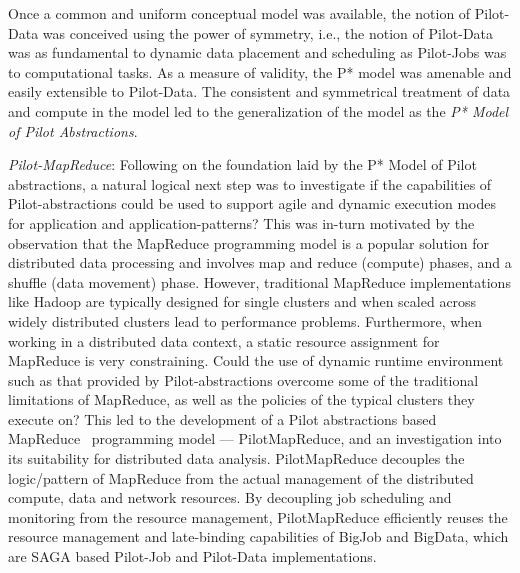 \documentclass[times]{cpeauth}
\newcommand{\pilot}{Pilot\xspace}
\newcommand{\pilotjobs}{Pilot-Jobs\xspace}
\newcommand{\pilotdata}{Pilot-Data\xspace}
\newcommand{\pilotmapreduce}{PilotMapReduce\xspace}
\newcommand{\pstar}{P*\xspace}
\begin{document}
Once a common and uniform conceptual model was available, the notion
of \pilotdata was conceived using the power of symmetry, i.e., the
notion of \pilotdata was as fundamental to dynamic data placement and
scheduling as \pilotjobs was to computational tasks. As a measure of
validity, the \pstar model was amenable and easily extensible to
\pilotdata.  The consistent and symmetrical treatment of data and
compute in the model led to the generalization of the model as the
{\it P* Model of Pilot Abstractions}.


{\it Pilot-MapReduce}: Following on the foundation laid by the P*
Model of Pilot abstractions, a natural logical next step was to
investigate if the capabilities of \pilot-abstractions could be used
to support agile and dynamic execution modes for application and
application-patterns?  This was in-turn motivated by the observation
that the MapReduce programming model is a popular solution for
distributed data processing and involves map and reduce (compute)
phases, and a shuffle (data movement) phase. However, traditional
MapReduce implementations like Hadoop are typically designed for
single clusters and when scaled across widely distributed clusters
lead to performance problems.  Furthermore, when working in a
distributed data context, a static resource assignment for MapReduce
is very constraining.  Could the use of dynamic runtime environment
such as that provided by \pilot-abstractions overcome some of the
traditional limitations of MapReduce, as well as the policies of the
typical clusters they execute on?  This led to the development of a
Pilot abstractions based
MapReduce~\cite{Mantha:2012:PEF:2287016.2287020} programming model ---
\pilotmapreduce, and an investigation into its suitability for
distributed data analysis.  \pilotmapreduce decouples the
logic/pattern of MapReduce from the actual management of the
distributed compute, data and network resources. By decoupling job
scheduling and monitoring from the resource management,
\pilotmapreduce efficiently reuses the resource management and
late-binding capabilities of BigJob and BigData, which are SAGA based
Pilot-Job and Pilot-Data implementations.
\end{document}
